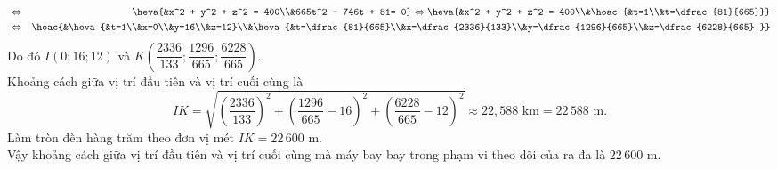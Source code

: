 \begin{ex}
{\begin{itemchoice}
\begin{eqnarray*}
				&\Leftrightarrow&\heva{&x^2 + y^2 + z^2 = 400\\&665t^2 - 746t + 81= 0}\Leftrightarrow\heva{&x^2 + y^2 + z^2 = 400\\&\hoac{&t=1\\&t=\dfrac{81}{665}}}\\
				&\Leftrightarrow&\hoac{&\heva{&t=1\\&x=0\\&y=16\\&z=12}\\&\heva{&t=\dfrac{81}{665}\\&x=\dfrac{2336}{133}\\&y=\dfrac{1296}{665}\\&z=\dfrac{6228}{665}.}}
			\end{eqnarray*}
			Do đó $I(0;16;12)$ và $K\left(\dfrac{2336}{133};\dfrac{1296}{665};\dfrac{6228}{665}\right)$.\\
			Khoảng cách giữa vị trí đầu tiên và vị trí cuối cùng là
			$$IK=\sqrt{\left(\dfrac{2336}{133}\right)^2+\left(\dfrac{1296}{665}-16\right)^2+\left(\dfrac{6228}{665}-12\right)^2}\approx 22{,}588 \text{ km} =22\,588 \text{ m}.$$
			Làm tròn đến hàng trăm theo đơn vị mét $IK=22\,600$ m.\\
			Vậy khoảng cách giữa vị trí đầu tiên và vị trí cuối cùng mà máy bay bay trong phạm vi theo dõi của ra đa là $22\,600$ m.
		\end{itemchoice}
	}
\end{ex}